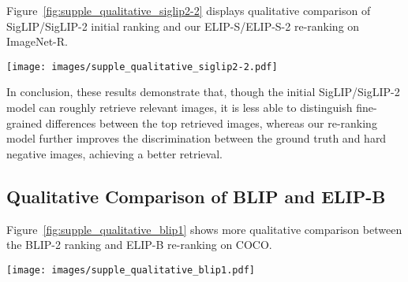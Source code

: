 \clearpage
Figure~\ref{fig:supple_qualitative_siglip2-2} displays qualitative comparison of SigLIP/SigLIP-2 initial ranking and our ELIP-S/ELIP-S-2 re-ranking on ImageNet-R. 


\begin{figure*}[h]
	\centering
\texttt{[image: images/supple\_qualitative\_siglip2-2.pdf]}
	\caption{
\textbf{Qualitative Comparison on ImageNet-R for SigLIP and ELIP-S (top), SigLIP-2 and ELIP-S-2 (bottom).} We display examples at the top-100 rankings where there is a difference between the two models, \emph{i.e.,} one model retrieves a positive sample while the other model retrieves a negative sample, as the majority of the top-100 retrieves samples are positive. \emph{Generally, ELIP-S/ELIP-S-2 retrieves more positive samples in top-100 images than SigLIP/SigLIP-2}. Negative samples (errors) are highlighted in an orange solid box. 
For the first example, the text query is `duck' and SigLIP retrieves some `goose's in top-100 retrieved images while our ELIP-S retrieves a `goose' in top-100 images; for the second example, the text query is `centipede' and SigLIP-2 retrieves some other insects in top-100 retrieved images.  
	} 
	\label{fig:supple_qualitative_siglip2-2}
	\end{figure*}

\clearpage
In conclusion, these results demonstrate that, though the initial SigLIP/SigLIP-2 model can roughly retrieve relevant images, it is less able to distinguish fine-grained differences between the top retrieved images, whereas our re-ranking model further improves the discrimination between the ground truth and hard negative images, achieving a better retrieval.









\clearpage
\subsection{Qualitative Comparison of BLIP and ELIP-B}

Figure~\ref{fig:supple_qualitative_blip1} shows more qualitative comparison between the BLIP-2 ranking and ELIP-B re-ranking on COCO. 

\begin{figure*}[h]
	\centering
\texttt{[image: images/supple\_qualitative\_blip1.pdf]}
	\caption{
\textbf{Qualitative Comparison on COCO for BLIP-2 and ELIP-B.} For each example, we show both top-5 rankings (from left to right) and highlight the ground truth image in a black dashed box.
In the first and second examples, the text queries are `There is dust coming out of the catcher's glove as a boy prepares to bat' and `Park scene, park bench, light pole and building in background, probably city park area', and the ground truth images are ranked top-5 / top-4 respectively by BLIP-2, but ranked top-1 by ELIP-B. 
	} 
	\label{fig:supple_qualitative_blip1}
	\end{figure*}



